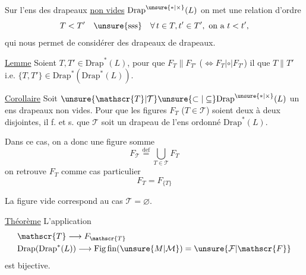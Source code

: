Sur l'ens des drapeaux \uline{non vides} $\mathrm{Drap}^{\unsure{*|\times}}(L)$ on met une relation d'ordre
\[
 T<T'\quad\text{\unsure{sss}}\quad \forall\,t\in T,t'\in T',\ \text{on a }t<t',
\]
qui nous permet de considérer des drapeaux de drapeaux.

\uline{Lemme} Soient $T,T'\in\mathrm{Drap}^{*}(L)$, pour que $F_T\parallel F_{T'}$ ($\Leftrightarrow F_T\mathrel{|\circ|}F_{T'}$) il  que $T\parallel T'$  i.e. $\{T,T'\}\in\mathrm{Drap}^{*}(\mathrm{Drap}^{*}(L))$.

\uline{Corollaire} Soit $\unsure{\mathscr{T}|\mathcal{T}}\unsure{\subset|\subseteq}\mathrm{Drap}^{\unsure{*|\times}}(L)$ un ens  drapeaux non vides. Pour que les figures $F_T$ ($T\in\mathscr{T}$) soient deux à deux disjointes, il f. et s. que $\mathscr{T}$ soit un drapeau de l'ens ordonné $\mathrm{Drap}^{*}(L)$.

Dans ce cas, on a donc une figure somme
\[
 F_{\mathscr{T}}\overset{\text{def}}{=}\bigcup_{T\in\mathscr{T}}F_T
\]
on retrouve $F_T$ comme cas particulier
\[
 F_T=F_{\{T\}}
\]

La figure vide correspond au cas $\mathscr{T}=\varnothing$.

\uline{Théorème} L'application
\[
\begin{aligned}
 &\mathscr{T}\longrightarrow F_{\mathscr{T}}\\
 &\mathrm{Drap}(\mathrm{Drap}^{*}(L))\longrightarrow
 \mathrm{Fig}\,\mathrm{fin}(\unsure{M|\mathcal M})=\unsure{\mathcal{F}|\mathscr{F}}
\end{aligned}
\]
est bijective.

